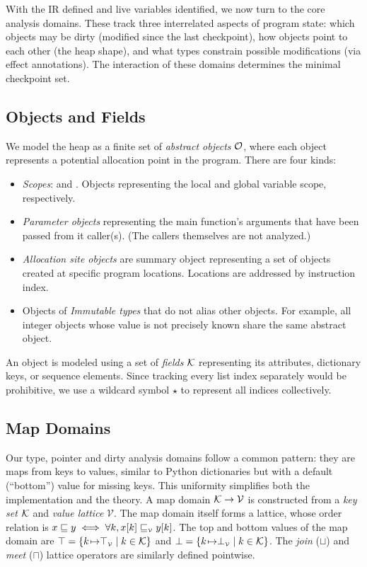 With the IR defined and live variables identified, we now turn to the core analysis domains. These track three interrelated aspects of program state: which objects may be dirty (modified since the last checkpoint), how objects point to each other (the heap shape), and what types constrain possible modifications (via effect annotations). The interaction of these domains determines the minimal checkpoint set.

\subsection{Objects and Fields}
We model the heap as a finite set of \emph{abstract objects} $\mathcal{O}$, where each object represents a potential allocation point in the program. There are four kinds:
\begin{itemize}
    \item \emph{Scopes}: \tLOCALS and \tGLOBALS. Objects representing the local and global variable scope,
respectively.
    \item \emph{Parameter objects} representing the main function's arguments that have been passed from it caller(s). (The callers themselves are not analyzed.)
    \item \emph{Allocation site objects} are summary object representing a set of objects created at specific program locations. 
Locations are addressed by \spytecode instruction index.
    \item Objects of \emph{Immutable types} that do not alias other objects. For example, all integer objects whose value is not precisely known share the same abstract object.
\end{itemize}

An object is modeled using a set of \emph{fields} $\mathcal{K}$ representing its attributes, dictionary keys, or sequence elements. Since tracking every list index separately would be prohibitive, we use a wildcard symbol $\star$ to represent all indices collectively.

\subsection{Map Domains}
Our type, pointer and dirty analysis domains follow a common pattern: they are maps from keys to values, similar to Python dictionaries but with a default (``bottom'') value for missing keys. This uniformity simplifies both the implementation and the theory.
A map domain $\mathcal{K}\to\mathcal{V}$ is constructed from a \emph{key set} $\mathcal{K}$ and \emph{value lattice} $\mathcal{V}$.
The map domain itself forms a lattice, whose order relation is 
$x\sqsubseteq y \iff \forall k,x[k]\sqsubseteq_{\scriptscriptstyle\mathcal{V}}y[k]$.
The top and bottom values of the map domain are
$\top=\{k{\hspace{1pt}\mapsto}\top_{\scriptscriptstyle\mathcal{V}}\mid k\in\mathcal{K}\}$
and
$\bot=\{k{\hspace{1pt}\mapsto}\bot_{\scriptscriptstyle\mathcal{V}}\mid k\in\mathcal{K}\}$.
The \emph{join} ($\sqcup$) and \emph{meet} ($\sqcap$) lattice operators are similarly defined pointwise.

